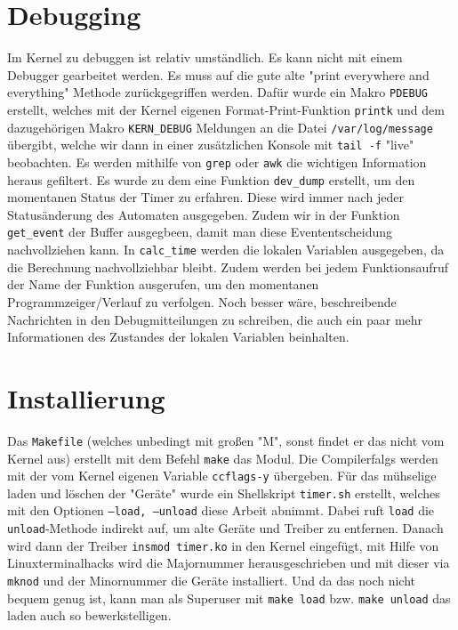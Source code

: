 \documentclass[
   draft=false
  ,paper=a4
  ,twoside=false
  ,fontsize=11pt
  ,headsepline
  ,BCOR10mm
  ,DIV11
  ,parskip=full+
]{scrartcl} %
\begin{document}
\section{Debugging}
Im Kernel zu debuggen ist relativ umständlich. Es kann nicht mit einem
Debugger gearbeitet werden. Es muss auf die gute alte "{}print everywhere and
everything"{} Methode zurückgegriffen werden. Dafür wurde ein Makro
\texttt{PDEBUG} erstellt, welches mit der Kernel eigenen Format-Print-Funktion
\texttt{printk} und dem dazugehörigen Makro \texttt{KERN\_DEBUG} Meldungen an
die Datei \texttt{/var/log/message} übergibt, welche wir dann in einer zusätzlichen
Konsole mit \texttt{tail -f} "{}live"{} beobachten. Es werden mithilfe von
\texttt{grep} oder \texttt{awk} die wichtigen Information heraus gefiltert.
Es wurde zu dem eine
Funktion \texttt{dev\_dump} erstellt, um den momentanen Status der Timer zu
erfahren. Diese wird immer nach jeder Statusänderung des Automaten ausgegeben.
Zudem wir in der Funktion \texttt{get\_event} der Buffer ausgegbeen, damit man 
diese Evententscheidung nachvollziehen kann. In \texttt{calc\_time} werden die
lokalen Variablen ausgegeben, da die Berechnung nachvollziehbar bleibt. 
Zudem werden bei jedem Funktionsaufruf der Name der Funktion ausgerufen, um 
den momentanen Programmzeiger/Verlauf zu verfolgen.
Noch besser wäre, beschreibende Nachrichten in den Debugmitteilungen zu 
schreiben, die auch ein paar mehr Informationen des Zustandes der lokalen 
Variablen beinhalten.


\section{Installierung}
Das \texttt{Makefile} (welches unbedingt mit großen "{}M"{}, sonst findet er
das nicht vom Kernel aus) erstellt mit dem Befehl \texttt{make} das Modul. Die
Compilerfalgs werden mit der vom Kernel eigenen Variable \texttt{ccflags-y}
übergeben.
Für das mühselige laden und löschen der "{}Geräte"{} wurde ein
Shellskript \texttt{timer.sh} erstellt, welches mit den Optionen
\texttt{--load, --unload} diese Arbeit abnimmt. Dabei ruft \texttt{load} die
\texttt{unload}-Methode indirekt auf, um alte Geräte und Treiber zu entfernen.
Danach wird dann der Treiber \texttt{insmod timer.ko} in den Kernel eingefügt,
mit Hilfe von Linuxterminalhacks wird die Majornummer herausgeschrieben und
mit dieser via \texttt{mknod} und der Minornummer die Geräte installiert.
Und da das noch nicht bequem genug ist, kann man als Superuser mit
\texttt{make load} bzw. \texttt{make unload} das laden auch so bewerkstelligen.
\end{document}
